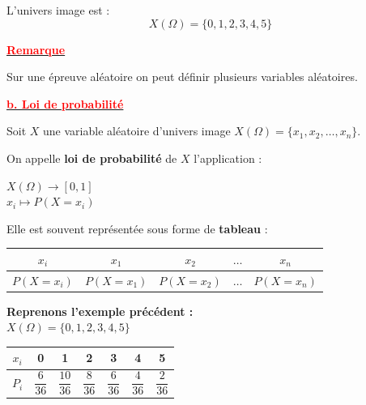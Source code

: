 \documentclass[12pt,a4paper]{article}
\newcounter{exemple}
\begin{document}
\vspace{1em}

L'univers image est : 
\[ X(\Omega) = \{0, 1, 2, 3, 4, 5\} \]

\underline{\textbf{\textcolor{red}{Remarque}}}

Sur une épreuve aléatoire on peut définir plusieurs variables aléatoires.


\underline{\textbf{\textcolor{red}{b. Loi de probabilité}}}

Soit $X$ une variable aléatoire d'univers image $X(\Omega) = \{x_1, x_2, \dots, x_n\}$.

\vspace{1em}

On appelle \textbf{loi de probabilité} de $X$ l'application :
\begin{center}
    $X(\Omega) \longrightarrow [0, 1]$ \\
    $x_i \longmapsto P(X = x_i)$
\end{center}

Elle est souvent représentée sous forme de \textbf{tableau} :

\begin{center}
    \renewcommand{\arraystretch}{1.5}
    \begin{tabular}{|c|c|c|c|c|}
        \hline
        $x_i$ & $x_1$ & $x_2$ & $\dots$ & $x_n$ \\ \hline
        $P(X = x_i)$ & $P(X = x_1)$ & $P(X = x_2)$ & $\dots$ & $P(X = x_n)$ \\ \hline
    \end{tabular}
\end{center}

\vspace{2em}

\textbf{Reprenons l'exemple précédent :} \\
$X(\Omega) = \{0, 1, 2, 3, 4, 5\}$

\begin{center}
    \renewcommand{\arraystretch}{1.8}
    \begin{tabular}{|c|c|c|c|c|c|c|}
        \hline
        $x_i$ & 0 & 1 & 2 & 3 & 4 & 5 \\ \hline
        $P_i$ & $\dfrac{6}{36}$ & $\dfrac{10}{36}$ & $\dfrac{8}{36}$ & $\dfrac{6}{36}$ & $\dfrac{4}{36}$ & $\dfrac{2}{36}$ \\ \hline
    \end{tabular}
\end{center}
\end{document}
